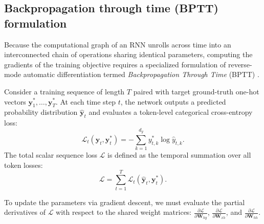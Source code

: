 \documentclass[../../../main.tex]{subfiles}
\begin{document}
\subsection{Backpropagation through time (BPTT) formulation}
\label{subsec:rnn_bptt_formulation}

Because the computational graph of an RNN unrolls across time into an interconnected chain of operations sharing identical parameters, computing the gradients of the training objective requires a specialized formulation of reverse-mode automatic differentiation termed \textit{Backpropagation Through Time} (BPTT) \citep{werbos1990}.

Consider a training sequence of length $T$ paired with target ground-truth one-hot vectors $\mathbf{y}_1^*, \dots, \mathbf{y}_T^*$. At each time step $t$, the network outputs a predicted probability distribution $\hat{\mathbf{y}}_t$ and evaluates a token-level categorical cross-entropy loss:
\begin{equation}
\mathcal{L}_t\left(\hat{\mathbf{y}}_t, \mathbf{y}_t^*\right) = -\sum_{k=1}^{d_y} y_{t, k}^* \log \hat{y}_{t, k}.
\end{equation}
The total scalar sequence loss $\mathcal{L}$ is defined as the temporal summation over all token losses:
\begin{equation}
\mathcal{L} = \sum_{t=1}^T \mathcal{L}_t\left(\hat{\mathbf{y}}_t, \mathbf{y}_t^*\right).
\label{eq:rnn_total_loss}
\end{equation}

To update the parameters via gradient descent, we must evaluate the partial derivatives of $\mathcal{L}$ with respect to the shared weight matrices: $\frac{\partial \mathcal{L}}{\partial \mathbf{W}_{hy}}$, $\frac{\partial \mathcal{L}}{\partial \mathbf{W}_{xh}}$, and $\frac{\partial \mathcal{L}}{\partial \mathbf{W}_{hh}}$.
\end{document}
